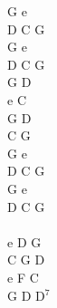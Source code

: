 \documentclass[a5paper, 10pt]{book}
\begin{document}
\begin{minipage}[t]{0.15\textwidth}
  G e\\
  D C G\\
  G e\\
  D C G\\
  
  G D\\
  e C\\
  G D\\
  C G\\
  
  G e\\
  D C G\\
  G e\\
  D C G\\
  
  ~\\
  
  e D G\\
  C G D\\
  e F C\\
  G D D$^7$\\
  
\end{minipage}
  




\newpage
\end{document}
